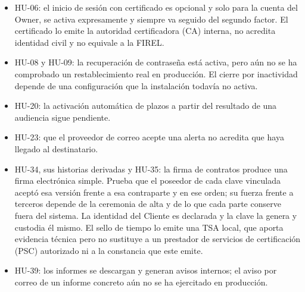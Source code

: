 \begin{itemize}
  \item \mbox{HU-06}: el inicio de sesión con certificado es opcional y solo para la cuenta del Owner, se activa expresamente y siempre va seguido del segundo factor. El certificado lo emite la autoridad certificadora (CA) interna, no acredita identidad civil y no equivale a la FIREL.
  \item \mbox{HU-08} y \mbox{HU-09}: la recuperación de contraseña está activa, pero aún no se ha comprobado un restablecimiento real en producción. El cierre por inactividad depende de una configuración que la instalación todavía no activa.
  \item \mbox{HU-20}: la activación automática de plazos a partir del resultado de una audiencia sigue pendiente.
  \item \mbox{HU-23}: que el proveedor de correo acepte una alerta no acredita que haya llegado al destinatario.
  \item \mbox{HU-34}, sus historias derivadas y \mbox{HU-35}: la firma de contratos produce una firma electrónica simple. Prueba que el poseedor de cada clave vinculada aceptó esa versión frente a esa contraparte y en ese orden; su fuerza frente a terceros depende de la ceremonia de alta y de lo que cada parte conserve fuera del sistema. La identidad del Cliente es declarada y la clave la genera y custodia él mismo. El sello de tiempo lo emite una TSA local, que aporta evidencia técnica pero no sustituye a un prestador de servicios de certificación (PSC) autorizado ni a la constancia que este emite.
  \item \mbox{HU-39}: los informes se descargan y generan avisos internos; el aviso por correo de un informe concreto aún no se ha ejercitado en producción.
\end{itemize}
